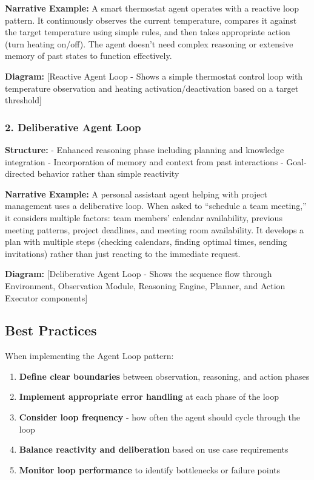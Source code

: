 \documentclass[11pt,oneside]{book}
\providecommand{\tightlist}{%
  \setlength{\itemsep}{0pt}\setlength{\parskip}{0pt}}
\begin{document}
\textbf{Narrative Example:} A smart thermostat agent operates with a
reactive loop pattern. It continuously observes the current temperature,
compares it against the target temperature using simple rules, and then
takes appropriate action (turn heating on/off). The agent doesn't need
complex reasoning or extensive memory of past states to function
effectively.

\textbf{Diagram:} {[}Reactive Agent Loop - Shows a simple thermostat
control loop with temperature observation and heating
activation/deactivation based on a target threshold{]}

\subsubsection{2. Deliberative Agent
Loop}\label{deliberative-agent-loop}

\textbf{Structure:} - Enhanced reasoning phase including planning and
knowledge integration - Incorporation of memory and context from past
interactions - Goal-directed behavior rather than simple reactivity

\textbf{Narrative Example:} A personal assistant agent helping with
project management uses a deliberative loop. When asked to ``schedule a
team meeting,'' it considers multiple factors: team members' calendar
availability, previous meeting patterns, project deadlines, and meeting
room availability. It develops a plan with multiple steps (checking
calendars, finding optimal times, sending invitations) rather than just
reacting to the immediate request.

\textbf{Diagram:} {[}Deliberative Agent Loop - Shows the sequence flow
through Environment, Observation Module, Reasoning Engine, Planner, and
Action Executor components{]}

\subsection{Best Practices}\label{best-practices}

When implementing the Agent Loop pattern:

\begin{enumerate}
\def\labelenumi{\arabic{enumi}.}
\tightlist
\item
  \textbf{Define clear boundaries} between observation, reasoning, and
  action phases
\item
  \textbf{Implement appropriate error handling} at each phase of the
  loop
\item
  \textbf{Consider loop frequency} - how often the agent should cycle
  through the loop
\item
  \textbf{Balance reactivity and deliberation} based on use case
  requirements
\item
  \textbf{Monitor loop performance} to identify bottlenecks or failure
  points
\end{enumerate}
\end{document}
